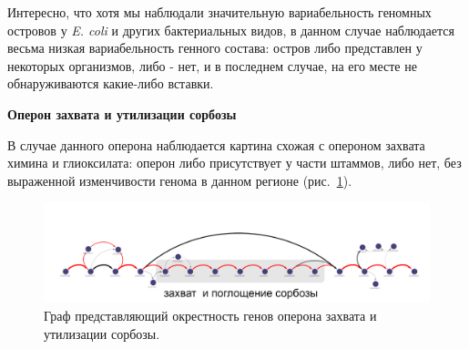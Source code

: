 
Интересно, что хотя мы наблюдали значительную вариабельность геномных островов у \textit{E. coli} и других бактериальных видов, в данном случае наблюдается весьма низкая вариабельность генного состава: остров либо представлен у некоторых организмов, либо - нет, и в последнем случае, на его месте не обнаруживаются какие-либо вставки.

\textbf{Оперон захвата и утилизации сорбозы}

В случае данного оперона наблюдается картина схожая с опероном захвата химина и глиоксилата: оперон либо присутствует у части штаммов, либо нет, без выраженной изменчивости генома в данном регионе (рис.~\ref{img:sorbitol}). 

\begin{figure}[!ht] 
	\center
	\includegraphics[width=\textwidth]{Dissertation/images/subgraphs/sorbitol.png}
	\caption{Граф представляющий окрестность генов оперона захвата и утилизации сорбозы. }
	\label{img:sorbitol} 
\end{figure}

